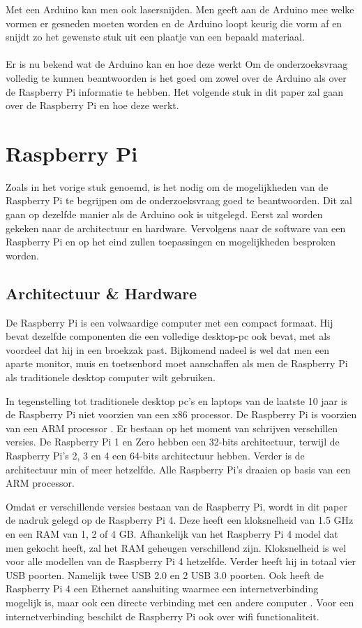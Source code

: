 \documentclass[a4paper, dutch, abstract=true]{scrartcl}
\begin{document}
Met een Arduino kan men ook lasersnijden.
Men geeft aan de Arduino mee welke vormen er gesneden moeten worden en de Arduino loopt keurig die
vorm af en snijdt zo het gewenste stuk uit een plaatje van een bepaald materiaal.

\paragraph*{}
Er is nu bekend wat de Arduino kan en hoe deze werkt
Om de onderzoeksvraag volledig te kunnen beantwoorden is het goed om zowel over de Arduino als over
de Raspberry Pi informatie te hebben.
Het volgende stuk in dit paper zal gaan over de Raspberry Pi en hoe deze werkt.

\section{Raspberry Pi}
Zoals in het vorige stuk genoemd, is het nodig om de mogelijkheden van de Raspberry Pi te
begrijpen om de onderzoeksvraag goed te beantwoorden.
Dit zal gaan op dezelfde manier als de Arduino ook is uitgelegd.
Eerst zal worden gekeken naar de architectuur en hardware.
Vervolgens naar de software van een Raspberry Pi en op het eind zullen toepassingen en mogelijkheden
besproken worden.

\subsection{Architectuur \& Hardware}
De Raspberry Pi is een volwaardige computer met een compact formaat.
Hij bevat dezelfde componenten die een volledige desktop-pc ook bevat, met als voordeel dat hij in
een broekzak past.
Bijkomend nadeel is wel dat men een aparte monitor, muis en toetsenbord moet aanschaffen als men de
Raspberry Pi als traditionele desktop computer wilt gebruiken.

In tegenstelling tot traditionele desktop pc's en laptops van de laatste 10 jaar is de Raspberry Pi
niet voorzien van een x86 processor.
De Raspberry Pi is voorzien van een ARM processor \cite{jain2014raspberry}.
Er bestaan op het moment van schrijven verschillen versies.
De Raspberry Pi 1 en Zero hebben een 32-bits architectuur, terwijl de Raspberry Pi's 2, 3 en 4 een
64-bits architectuur hebben.
Verder is de architectuur min of meer hetzelfde.
Alle Raspberry Pi's draaien op basis van een ARM processor.

Omdat er verschillende versies bestaan van de Raspberry Pi, wordt in dit paper de nadruk gelegd op
de Raspberry Pi 4.
Deze heeft een kloksnelheid van 1.5 GHz en een RAM van 1, 2 of 4 GB.
Afhankelijk van het Raspberry Pi 4 model dat men gekocht heeft, zal het RAM geheugen verschillend
zijn.
Kloksnelheid is wel voor alle modellen van de Raspberry Pi 4 hetzelfde.
Verder heeft hij in totaal vier USB poorten.
Namelijk twee USB 2.0 en 2 USB 3.0 poorten.
Ook heeft de Raspberry Pi 4 een Ethernet aansluiting waarmee een internetverbinding mogelijk is,
maar ook een directe verbinding met een andere computer \cite{maksimovic2014raspberry}.
Voor een internetverbinding beschikt de Raspberry Pi ook over wifi functionaliteit.
\end{document}
